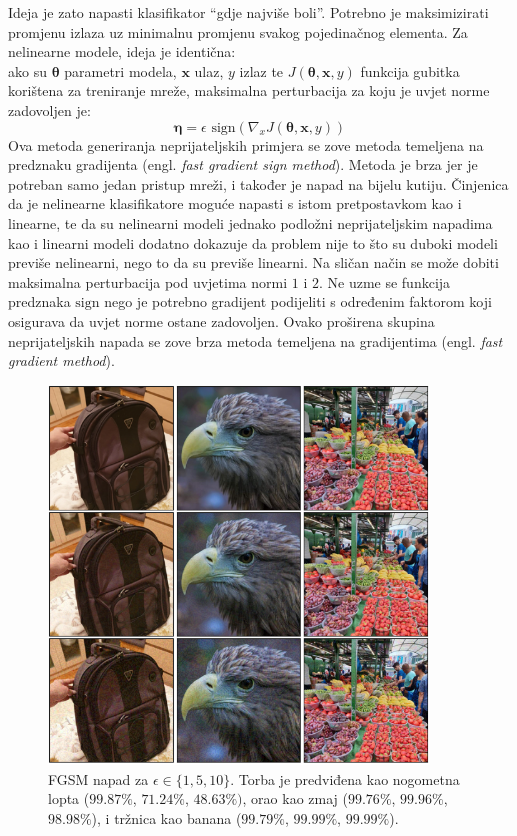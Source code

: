 \documentclass[utf8, diplomski]{fer}
\begin{document}
\par
Ideja je zato napasti klasifikator ``gdje najviše boli''. Potrebno je maksimizirati promjenu izlaza uz minimalnu promjenu svakog pojedinačnog elementa. Za nelinearne modele, ideja je identična: \\
ako su $\boldsymbol{\theta}$ parametri modela, $\boldsymbol{x}$ ulaz, $y$ izlaz te $J(\boldsymbol{\theta}, \boldsymbol{x}, y)$ funkcija gubitka korištena za treniranje mreže, maksimalna perturbacija za koju je uvjet norme zadovoljen je:
\begin{equation}
	\boldsymbol{\eta} = \epsilon \text{ sign}(\nabla_{x}J(\boldsymbol{\theta}, \boldsymbol{x}, y))
\end{equation}
Ova metoda generiranja neprijateljskih primjera se zove metoda temeljena na predznaku gradijenta (engl. \textit{fast gradient sign method}). Metoda je brza jer je potreban samo jedan pristup mreži, i također je napad na bijelu kutiju.
Činjenica da je nelinearne klasifikatore moguće napasti s istom pretpostavkom kao i linearne, te da su nelinearni modeli jednako podložni neprijateljskim napadima kao i linearni modeli dodatno dokazuje da problem nije to što su duboki modeli previše nelinearni, nego to da su previše linearni. Na sličan način se može dobiti maksimalna perturbacija pod uvjetima normi $1$ i $2$. Ne uzme se funkcija predznaka $\text{sign}$ nego je potrebno gradijent podijeliti s određenim faktorom koji osigurava da uvjet norme ostane zadovoljen. Ovako proširena skupina neprijateljskih napada se zove brza metoda temeljena na gradijentima (engl. \textit{fast gradient method}). \\
\begin{figure}[H]
\centering
\includegraphics[width=0.9\textwidth,keepaspectratio]{img/results/fgm_inf_1510.png}
\caption{FGSM napad za $\epsilon \in \{1, 5, 10\}$. Torba je predviđena kao nogometna lopta ($99.87\%$, $71.24\%$, $48.63\%)$, orao kao zmaj ($99.76\%$, $99.96\%$, $98.98\%$), i tržnica kao banana ($99.79\%$, $99.99\%$, $99.99\%$).}
\end{figure}\label{fgsm_ex}
\end{document}
